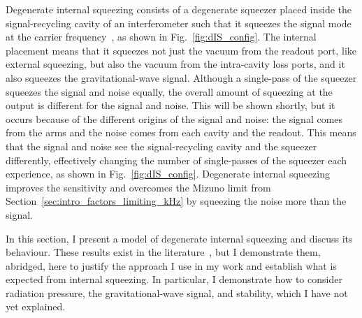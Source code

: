 Degenerate internal squeezing consists of a degenerate squeezer placed inside the signal-recycling cavity of an interferometer such that it squeezes the signal mode at the carrier frequency~\cite{}, as shown in Fig.~\ref{fig:dIS_config}. The internal placement means that it squeezes not just the vacuum from the readout port, like external squeezing, but also the vacuum from the intra-cavity loss ports, and it also squeezes the gravitational-wave signal. Although a single-pass of the squeezer squeezes the signal and noise equally, %
the overall amount of squeezing at the output is different for the signal and noise. This will be shown shortly, but it occurs because of the different origins of the signal and noise: the signal comes from the arms and the noise comes from each cavity and the readout. This means that the signal and noise see  the signal-recycling cavity and the squeezer differently, effectively changing the number of single-passes of the squeezer each experience, as shown in Fig.~\ref{fig:dIS_config}. 
Degenerate internal squeezing improves the sensitivity and overcomes the Mizuno limit from Section~\ref{sec:intro_factors_limiting_kHz} by squeezing the noise more than the signal.

In this section, I present a model of degenerate internal squeezing and discuss its behaviour. These results exist in the literature~\cite{Korobko2019}, but I demonstrate them, abridged, here to justify the approach I use in my work and establish what is expected from internal squeezing. In particular, I demonstrate how to consider radiation pressure, the gravitational-wave signal, and stability, which I have not yet explained.

